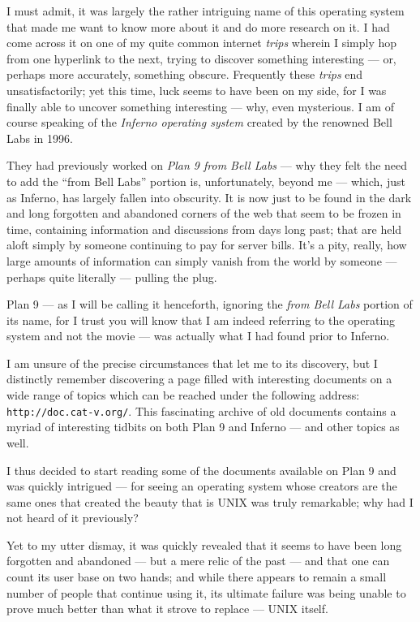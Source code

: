 \documentclass[a5paper,twoside,12pt]{report}
\begin{document}
I must admit, it was largely the rather intriguing name of this operating system that made me want to know more about it and do more research on it. I had come across it on one of my quite common internet \textit{trips} wherein I simply hop from one hyperlink to the next, trying to discover something interesting — or, perhaps more accurately, something obscure. 
Frequently these \textit{trips} end unsatisfactorily; yet this time, luck seems to have been on my side, for I was finally able to uncover something interesting — why, even mysterious. I am of course speaking of the \textit{Inferno operating system} created by the renowned Bell Labs in 1996. 

They had previously worked on \textit{Plan 9 from Bell Labs} — why they felt the need to add the ``from Bell Labs'' portion is, unfortunately, beyond me — which, just as Inferno, has largely fallen into obscurity. It is now just to be found in the dark and long forgotten and abandoned corners of the web that seem to be frozen in time, containing information and discussions from days long past; that are held aloft simply by someone continuing to pay for server bills. It's a pity, really, how large amounts of information can simply vanish from the world by someone — perhaps quite literally — pulling the plug.

Plan 9 — as I will be calling it henceforth, ignoring the \textit{from Bell Labs} portion of its name, for I trust you will know that I am indeed referring to the operating system and not the movie — was actually what I had found prior to Inferno.

I am unsure of the precise circumstances that let me to its discovery, but I distinctly remember discovering a page filled with interesting documents on a wide range of topics which can be reached under the following address: \texttt{http://doc.cat-v.org/}. 
This fascinating archive of old documents contains a myriad of interesting tidbits on both Plan 9 and Inferno — and other topics as well. 

I thus decided to start reading some of the documents available on Plan 9 and was quickly intrigued — for seeing an operating system whose creators are the same ones that created the beauty that is UNIX was truly remarkable; why had I not heard of it previously?

Yet to my utter dismay, it was quickly revealed that it seems to have been long forgotten and abandoned — but a mere relic of the past — and that one can count its user base on two hands; and while there appears to remain a small number of people that continue using it, its ultimate failure was being unable to prove much better than what it strove to replace — UNIX itself.
\end{document}

